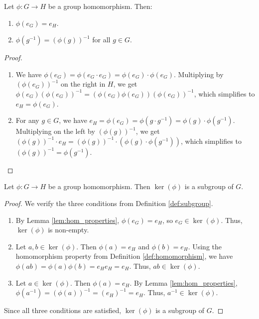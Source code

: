 \begin{lemma}
\label{lem:hom_properties}
Let $\phi: G \to H$ be a group homomorphism. Then:
\begin{enumerate}
    \item $\phi(e_G) = e_H$.
    \item $\phi(g^{-1}) = (\phi(g))^{-1}$ for all $g \in G$.
\end{enumerate}
\end{lemma}
\begin{proof}
\begin{enumerate}
    \item We have $\phi(e_G) = \phi(e_G \cdot e_G) = \phi(e_G) \cdot \phi(e_G)$. Multiplying by $(\phi(e_G))^{-1}$ on the right in $H$, we get $\phi(e_G)(\phi(e_G))^{-1} = (\phi(e_G)\phi(e_G))(\phi(e_G))^{-1}$, which simplifies to $e_H = \phi(e_G)$.
    \item For any $g \in G$, we have $e_H = \phi(e_G) = \phi(g \cdot g^{-1}) = \phi(g) \cdot \phi(g^{-1})$. Multiplying on the left by $(\phi(g))^{-1}$, we get $(\phi(g))^{-1} \cdot e_H = (\phi(g))^{-1} \cdot (\phi(g) \cdot \phi(g^{-1}))$, which simplifies to $(\phi(g))^{-1} = \phi(g^{-1})$.
\end{enumerate}
\end{proof}

\begin{lemma}
\label{lem:kernel_subgroup}
Let $\phi: G \to H$ be a group homomorphism. Then $\ker(\phi)$ is a subgroup of $G$.
\end{lemma}
\begin{proof}
We verify the three conditions from Definition \ref{def:subgroup}.
\begin{enumerate}
    \item By Lemma \ref{lem:hom_properties}, $\phi(e_G) = e_H$, so $e_G \in \ker(\phi)$. Thus, $\ker(\phi)$ is non-empty.
    \item Let $a, b \in \ker(\phi)$. Then $\phi(a) = e_H$ and $\phi(b) = e_H$. Using the homomorphism property from Definition \ref{def:homomorphism}, we have $\phi(ab) = \phi(a)\phi(b) = e_H e_H = e_H$. Thus, $ab \in \ker(\phi)$.
    \item Let $a \in \ker(\phi)$. Then $\phi(a) = e_H$. By Lemma \ref{lem:hom_properties}, $\phi(a^{-1}) = (\phi(a))^{-1} = (e_H)^{-1} = e_H$. Thus, $a^{-1} \in \ker(\phi)$.
\end{enumerate}
Since all three conditions are satisfied, $\ker(\phi)$ is a subgroup of $G$.
\end{proof}


